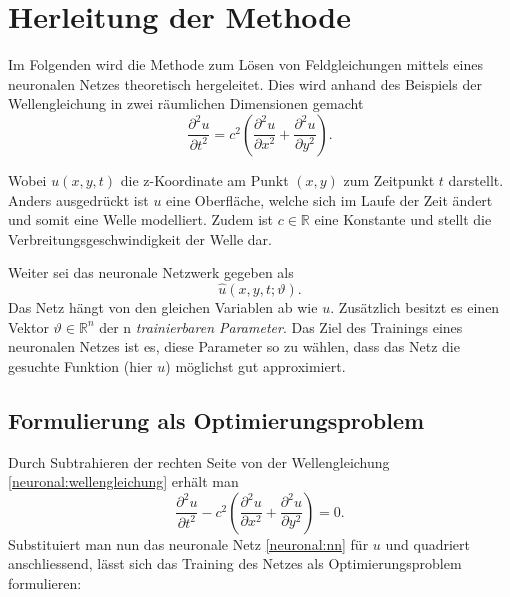 %
%
%
%

\section{Herleitung der Methode\label{neuronal:section:herleitung}}

Im Folgenden wird die Methode zum Lösen von Feldgleichungen mittels eines neuronalen Netzes theoretisch hergeleitet.
Dies wird anhand des Beispiels der Wellengleichung in zwei räumlichen Dimensionen gemacht
\begin{equation}
    \frac{\partial^2 u}{\partial t^2} = c^2 \left( \frac{\partial^2 u}{\partial x^2} + \frac{\partial^2 u}{\partial y^2} \right).
    \label{neuronal:wellengleichung}
\end{equation}

Wobei \( u(x, y, t) \) die z-Koordinate am Punkt \( (x, y) \) zum Zeitpunkt \( t \) darstellt.
Anders ausgedrückt ist \( u \) eine Oberfläche, welche sich im Laufe der Zeit ändert und somit eine Welle modelliert. 
Zudem ist \( c \in \mathbb{R} \) eine Konstante und stellt die Verbreitungsgeschwindigkeit der Welle dar.

Weiter sei das neuronale Netzwerk gegeben als
\begin{equation}
    \hat{u}(x, y, t; \vartheta).
    \label{neuronal:nn}
\end{equation}
Das Netz hängt von den gleichen Variablen ab wie \( u \).
Zusätzlich besitzt es einen Vektor \( \vartheta \in \mathbb{R}^n \) der n \emph{trainierbaren Parameter}.
Das Ziel des Trainings eines neuronalen Netzes ist es, diese Parameter so zu wählen, dass das Netz die gesuchte Funktion (hier \( u \)) möglichst gut approximiert.


\subsection{Formulierung als Optimierungsproblem}\label{neuronal:subsection:optimierungsproblem}
Durch Subtrahieren der rechten Seite von der Wellengleichung \eqref{neuronal:wellengleichung} erhält man
\begin{equation}
    \frac{\partial^2 u}{\partial t^2} - c^2 \left( \frac{\partial^2 u}{\partial x^2} + \frac{\partial^2 u}{\partial y^2} \right) = 0.
\end{equation}
Substituiert man nun das neuronale Netz \eqref{neuronal:nn} für \( u \) und quadriert anschliessend, lässt sich das Training des Netzes als Optimierungsproblem formulieren:\newline


